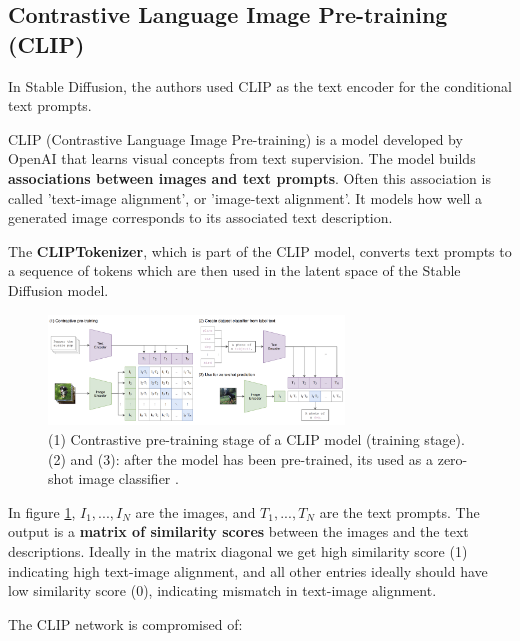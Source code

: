 \subsection{Contrastive Language Image Pre-training (CLIP)}
\label{subsec:clip}

In Stable Diffusion, the authors used CLIP as the text encoder for the conditional text prompts.

CLIP (Contrastive Language Image Pre-training) \cite{openai_clip} is a model developed by OpenAI that learns visual concepts from text supervision. The model builds \textbf{associations between images and text prompts}. Often this association is called 'text-image alignment', or 'image-text alignment'. It models how well a generated image corresponds to its associated text description.

The \textbf{CLIPTokenizer}, which is part of the CLIP model, converts text prompts to a sequence of tokens which are then used in the latent space of the Stable Diffusion model.

\begin{figure}
    \centering
    \includegraphics[width=0.7\textwidth]{images/diffusion_models/stable_diffusion/clip.png}
    \caption{(1) Contrastive pre-training stage of a CLIP model (training stage). (2) and (3): after the model has been pre-trained, its used as a zero-shot image classifier \cite{openai_clip}.}
    \label{fig:openai_clip}
\end{figure}

In figure \ref{fig:openai_clip},  $I_1, ..., I_N$ are the images, and $T_1, ..., T_N$ are the text prompts. The output is a \textbf{matrix of similarity scores} between the images and the text descriptions. Ideally in the matrix diagonal we get high similarity score (1) indicating high text-image alignment, and all other entries ideally should have low similarity score (0), indicating mismatch in text-image alignment.

The CLIP network is compromised of:

